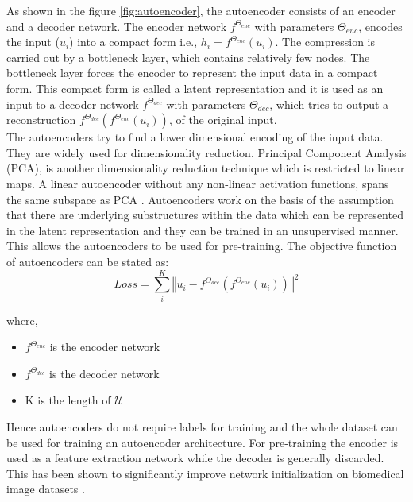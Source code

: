 As shown in the figure \ref{fig:autoencoder}, the autoencoder consists of an encoder and a decoder network. The encoder network $f^{\Theta_{enc}}$ with parameters $\Theta_{enc}$, encodes the input ($u_i$) into a compact form i.e., $h_i = f^{\Theta_{enc}}(u_i)$. The compression is carried out by a bottleneck layer, which contains relatively few nodes. The bottleneck layer forces the encoder to represent the input data in a compact form. This compact form is called a latent representation and it is used as an input to a decoder network $f^{\Theta_{dec}}$ with parameters $\Theta_{dec}$, which tries to output a reconstruction $f^{\Theta_{dec}}(f^{\Theta_{enc}}(u_i))$, of the original input. \\
The autoencoders try to find a lower dimensional encoding of the input data. They are widely used for dimensionality reduction. Principal Component Analysis (PCA), is another dimensionality reduction technique which is restricted to linear maps. A linear autoencoder without any non-linear activation functions, spans the same subspace as PCA \cite{baldi1989}. Autoencoders work on the basis of the assumption that there are underlying substructures within the data which can be represented in the latent representation and they can be trained in an unsupervised manner. This allows the autoencoders to be used for pre-training.
The objective function of autoencoders can be stated as:
\begin{equation}
    \label{equation:autoencoders_loss}
    Loss = \sum_{i}^{K} \left\Vert u_i - f^{\Theta_{dec}}(f^{\Theta_{enc}}(u_i)) \right\Vert^2
\end{equation}

where,
\begin{itemize}[label={}]
  \setlength\itemsep{0em}
  \item $f^{\Theta_{enc}}$ is the encoder network
  \item $f^{\Theta_{dec}}$ is the decoder network
  \item K is the length of $\mathcal{U}$
\end{itemize}

Hence autoencoders do not require labels for training and the whole dataset can be used for training an autoencoder architecture. For pre-training the encoder is used as a feature extraction network while the decoder is generally discarded. This has been shown to significantly improve network initialization on biomedical image datasets \cite{ferreira2020}.

